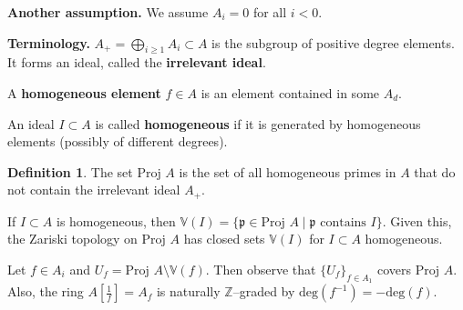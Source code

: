 \documentclass{article}
\theoremstyle{definition}
\newtheorem{defn}{Definition}[section]
\begin{document}
\textbf{Another assumption.} We assume $A_i = 0$ for all $i < 0$.
\vspace{1mm}
 
\textbf{Terminology.} $A_+ = \bigoplus_{i\ge 1} A_i \subset A$ is the subgroup of positive degree elements. It forms an ideal, called the \textbf{irrelevant ideal}. 
\vspace{1mm}
 
A \textbf{homogeneous element} $f \in A$ is an element contained in some $A_d$. 
\vspace{1mm}
 
An ideal $I \subset A$ is called \textbf{homogeneous} if it is generated by homogeneous elements (possibly of different degrees).

\begin{defn}
    The set $\text{Proj }A$ is the set of all homogeneous primes in $A$ that do not contain the irrelevant ideal $A_+$.
    \vspace{1mm}
     
    If $I \subset A$ is homogeneous, then $\mathbb{V}(I) = \{\mathfrak{p} \in \text{Proj }A \mid \mathfrak{p} \text{ contains }I\}$. Given this, the Zariski topology on $\text{Proj }A$ has closed sets $\mathbb{V}(I)$ for $I \subset A$ homogeneous.
\end{defn}

Let $f \in A_i$ and $U_f = \text{Proj }A\setminus \mathbb{V}(f)$. Then observe that $\{U_f\}_{f \in A_1}$ covers $\text{Proj }A$. Also, the ring $A[\frac{1}{f}] = A_f$ is naturally $\mathbb{Z}$--graded by $\text{deg}(f^{-1})= - \text{deg}(f)$.
\end{document}
